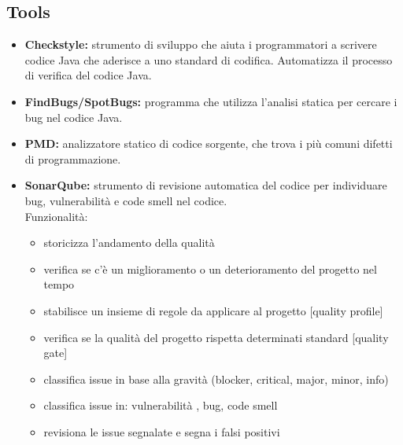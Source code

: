 \subsection{Tools}
\begin{itemize}
    \item \textbf{Checkstyle:} strumento di sviluppo che aiuta i programmatori a scrivere codice Java che aderisce a uno standard di codifica. Automatizza il processo di verifica del codice Java.
    \item \textbf{FindBugs/SpotBugs:} programma che utilizza l'analisi statica per cercare i bug nel codice Java.
    \item \textbf{PMD:} analizzatore statico di codice sorgente, che trova i più comuni difetti di programmazione.
    \item \textbf{SonarQube:} strumento di revisione automatica del codice per individuare bug, vulnerabilità e code smell nel codice. \\
    Funzionalità:
    \begin{itemize}
        \item storicizza l'andamento della qualità
        \item verifica se c'è un miglioramento o un deterioramento del progetto nel tempo
        \item stabilisce un insieme di regole da applicare al progetto [quality profile]
        \item verifica se la qualità del progetto rispetta determinati standard [quality gate]
        \item classifica issue in base alla gravità (blocker, critical, major, minor, info)
        \item classifica issue in: vulnerabilità , bug, code smell
        \item revisiona le issue segnalate e segna i falsi positivi
    \end{itemize}
\end{itemize}

